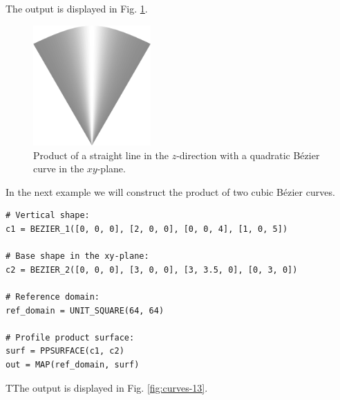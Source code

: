 \noindent
The output is displayed in Fig. \ref{fig:curves-13b}.\\

\begin{figure}[!ht]
\begin{center}
\includegraphics[width=0.4\textwidth]{img/curves-13b.png}
\end{center}
\vspace{-4mm}
\caption{Product of a straight line in the $z$-direction with a quadratic B\'ezier 
         curve in the $xy$-plane.}
\label{fig:curves-13b}
\end{figure}
\noindent
In the next example we will construct the product of two cubic 
B\'ezier curves.\\

\begin{bbox}
\begin{verbatim}
# Vertical shape:
c1 = BEZIER_1([0, 0, 0], [2, 0, 0], [0, 0, 4], [1, 0, 5])

# Base shape in the xy-plane:
c2 = BEZIER_2([0, 0, 0], [3, 0, 0], [3, 3.5, 0], [0, 3, 0])

# Reference domain:
ref_domain = UNIT_SQUARE(64, 64)

# Profile product surface: 
surf = PPSURFACE(c1, c2)
out = MAP(ref_domain, surf)
\end{verbatim}
\end{bbox}
\vspace{6mm}

\noindent
TThe output is displayed in Fig. \ref{fig:curves-13}.\\


